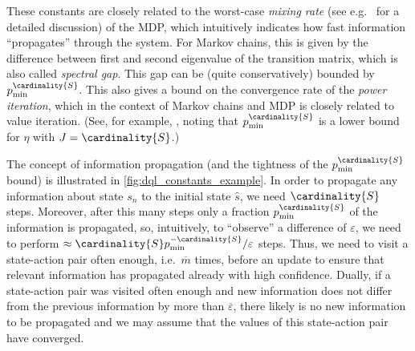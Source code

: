 \documentclass{theoretics}
\newcommand{\States}{S}
\newcommand{\initialstate}{\hat{s}}
\newcommand{\updatestep}{{\overline{\varepsilon}}}
\newcommand{\delay}{{\overline{m}}}
\begin{document}
These constants are closely related to the worst-case \emph{mixing rate} (see e.g.\ \cite[Chapter~5]{levin2017markov} for a detailed discussion) of the MDP, which intuitively indicates how fast information \enquote{propagates} through the system.
For Markov chains, this is given by the difference between first and second eigenvalue of the transition matrix, which is also called \emph{spectral gap}.
This gap can be (quite conservatively) bounded by $p_{\min}^{\cardinality{\States}}$.
This also gives a bound on the convergence rate of the \emph{power iteration}, which in the context of Markov chains and MDP is closely related to value iteration.
(See, for example, \cite[Theorem~8.5.2]{DBLP:books/wi/Puterman94}, noting that $p_{\min}^{\cardinality{\States}}$ is a lower bound for $\eta$ with $J = \cardinality{\States}$.)

The concept of information propagation (and the tightness of the $p_{\min}^{\cardinality{\States}}$ bound) is illustrated in \cref{fig:dql_constants_example}.
In order to propagate any information about state $s_n$ to the initial state $\initialstate$, we need $\cardinality{\States}$ steps.
Moreover, after this many steps only a fraction $p_{\min}^{\cardinality{\States}}$ of the information is propagated, so, intuitively, to \enquote{observe} a difference of $\varepsilon$, we need to perform $\approx \cardinality{\States}p_{\min}^{-\cardinality{\States}} / \varepsilon$ steps.
Thus, we need to visit a state-action pair often enough, i.e.\ $\delay$ times, before an update to ensure that relevant information has propagated already with high confidence.
Dually, if a state-action pair was visited often enough and new information does not differ from the previous information by more than $\updatestep$, there likely is no new information to be propagated and we may assume that the values of this state-action pair have converged.
\end{document}
